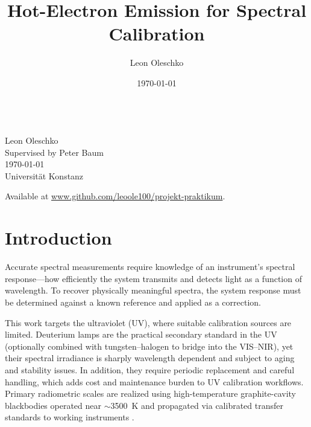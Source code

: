 \documentclass[
	parskip=half,
	a4paper,
]{scrarticle}
\begin{document}
\title{Hot-Electron Emission for Spectral Calibration}
\author{Leon Oleschko}
\date{\dotdate\today}

\begin{titlepage}
    \sffamily
    \vspace*{3cm}
    {
        \fontsize{32}{32}
    }
    \vspace{.25cm}\\
    {
        \Large
        Leon Oleschko\\
        Supervised by Peter Baum
        \vspace{.05cm}\\
        \dotdate\today\\
        Universität Konstanz
    }
    \vfill
    {
        \normalfont\normalsize

    }
    \vfill
    \begin{flushright}
        Available at \url{www.github.com/leoole100/projekt-praktikum}.
    \end{flushright}
\end{titlepage}


\clearpage

\section{Introduction}
Accurate spectral measurements require knowledge of an instrument’s spectral response—how efficiently the system transmits and detects light as a function of wavelength. To recover physically meaningful spectra, the system response must be determined against a known reference and applied as a correction.

This work targets the ultraviolet (UV), where suitable calibration sources are limited. Deuterium lamps are the practical secondary standard in the UV (optionally combined with tungsten–halogen to bridge into the VIS–NIR), yet their spectral irradiance is sharply wavelength dependent and subject to aging and stability issues. In addition, they require periodic replacement and careful handling, which adds cost and maintenance burden to UV calibration workflows. Primary radiometric scales are realized using high-temperature graphite-cavity blackbodies operated near $\sim$\SI{3500}{\kelvin} and propagated via calibrated transfer standards to working instruments \cite{yoon_nist_2011,sapritsky_black-body_1995}.
\end{document}
